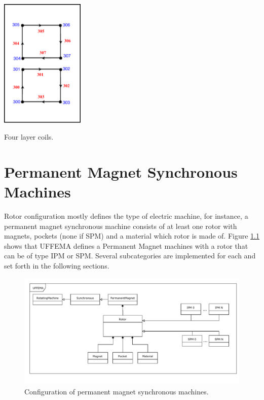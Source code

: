\documentclass[justified]{tufte-book} %
\begin{document}
\begin{marginfigure}
\includegraphics[width=4cm]{winding_fourlayer.pdf}
\caption{Four layer coils.}
\label{fig:winding_fourlayer}
\end{marginfigure}


\chapter{Permanent Magnet Synchronous Machines}
\label{ch:pmsm}
\begin{fullwidth}
Rotor configuration mostly defines the type of electric machine, for instance, a permanent magnet synchronous machine consists of at least one rotor with magnets, pockets (none if SPM) and a material which rotor is made of. Figure \ref{fig:pmsm} shows that UFFEMA defines a Permanent Magnet machines with a rotor that can be of type IPM or SPM. Several subcategories are implemented for each and set forth in the following sections. 
\end{fullwidth}

\begin{figure}[h]
\includegraphics[width=\linewidth]{Rotor_PermanentMagnet.pdf}
\caption{Configuration of permanent magnet synchronous machines.}
\label{fig:pmsm}
\end{figure}
\end{document}
